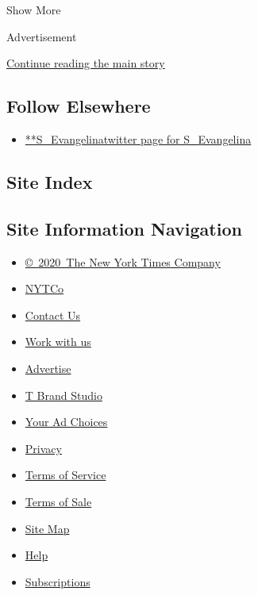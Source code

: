 Show More

Advertisement

\protect\hyperlink{after-mid2}{Continue reading the main story}

\hypertarget{follow-elsewhere}{%
\subsection{Follow Elsewhere}\label{follow-elsewhere}}

\begin{itemize}
\tightlist
\item
  \href{https://twitter.com/S_Evangelina}{**S\_Evangelinatwitter page
  for S\_Evangelina}
\end{itemize}

\hypertarget{site-index}{%
\subsection{Site Index}\label{site-index}}

\hypertarget{site-information-navigation}{%
\subsection{Site Information
Navigation}\label{site-information-navigation}}

\begin{itemize}
\tightlist
\item
  \href{https://help.nytimes3xbfgragh.onion/hc/en-us/articles/115014792127-Copyright-notice}{©~2020~The
  New York Times Company}
\end{itemize}

\begin{itemize}
\tightlist
\item
  \href{https://www.nytco.com/}{NYTCo}
\item
  \href{https://help.nytimes3xbfgragh.onion/hc/en-us/articles/115015385887-Contact-Us}{Contact
  Us}
\item
  \href{https://www.nytco.com/careers/}{Work with us}
\item
  \href{https://nytmediakit.com/}{Advertise}
\item
  \href{http://www.tbrandstudio.com/}{T Brand Studio}
\item
  \href{https://www.nytimes3xbfgragh.onion/privacy/cookie-policy\#how-do-i-manage-trackers}{Your
  Ad Choices}
\item
  \href{https://www.nytimes3xbfgragh.onion/privacy}{Privacy}
\item
  \href{https://help.nytimes3xbfgragh.onion/hc/en-us/articles/115014893428-Terms-of-service}{Terms
  of Service}
\item
  \href{https://help.nytimes3xbfgragh.onion/hc/en-us/articles/115014893968-Terms-of-sale}{Terms
  of Sale}
\item
  \href{https://spiderbites.nytimes3xbfgragh.onion}{Site Map}
\item
  \href{https://help.nytimes3xbfgragh.onion/hc/en-us}{Help}
\item
  \href{https://www.nytimes3xbfgragh.onion/subscription?campaignId=37WXW}{Subscriptions}
\end{itemize}
